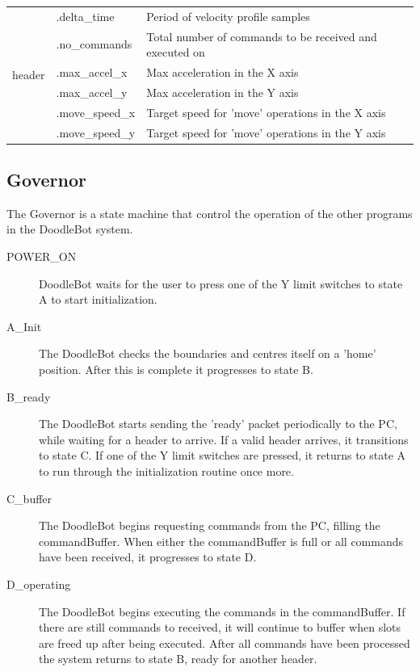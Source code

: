 \begin{center}
\begin{tabular}{|l|l|p{10cm}|}
				\multirow{6}{*}{header} & .delta\_time & Period of velocity profile samples\\ \cline{2-3}
					 & .no\_commands & Total number of commands to be received and executed on\\ \cline{2-3}
					 & .max\_accel\_x & Max acceleration in the X axis\\ \cline{2-3}
					 &  .max\_accel\_y & Max acceleration in the Y axis\\ \cline{2-3}
					 & .move\_speed\_x & Target speed for 'move' operations in the X axis\\ \cline{2-3}
					 & .move\_speed\_y & Target speed for 'move' operations in the Y axis\\ \hline
			\end{tabular}
			\label{table:globalvariables}
		\end{center}

	\subsection{Governor}
		
		The Governor is a state machine that control the operation of the other programs in the DoodleBot system.
		
		\begin{description}
			\item[POWER\_ON] DoodleBot waits for the user to press one of the Y limit switches to state A to start initialization.
			\item[A\_Init] The DoodleBot checks the boundaries and centres itself on a 'home' position. After this is complete it progresses to state B.
			\item[B\_ready] The DoodleBot starts sending the 'ready' packet periodically to the PC, while waiting for a header to arrive. If a valid header arrives, it transitions to state C. If one of the Y limit switches are pressed, it returns to state A to run through the initialization routine once more.
			\item[C\_buffer] The DoodleBot begins requesting commands from the PC, filling the commandBuffer. When either the commandBuffer is full or all commands have been received, it progresses to state D.
			\item[D\_operating] The DoodleBot begins executing the commands in the commandBuffer. If there are still commands to received, it will continue to buffer when slots are freed up after being executed. After all commands have been processed the system returns to state B, ready for another header.
		\end{description}
		
